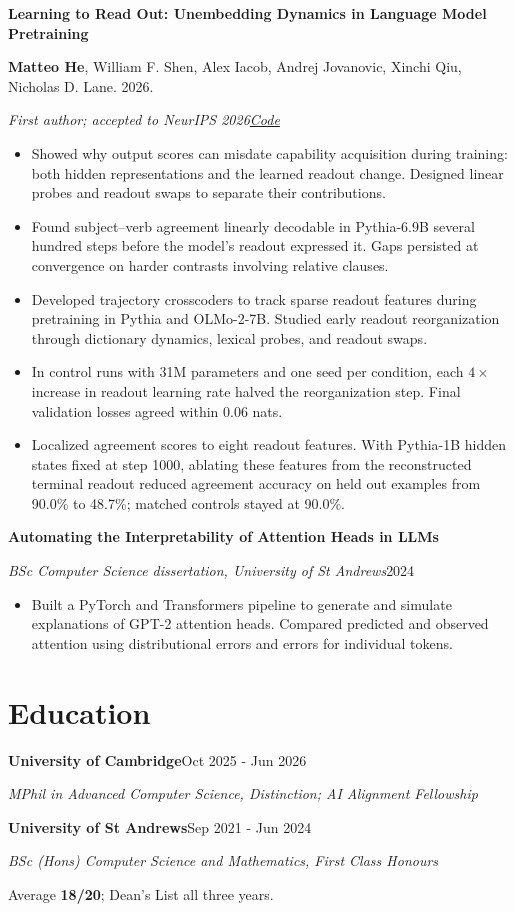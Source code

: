 \documentclass[letterpaper,11pt]{article}
\newcommand{\paper}[3]{\par\addvspace{7pt}\textbf{#1}\par{\fontsize{9.7}{11.3}\selectfont #2\par\textit{#3}\par}\nopagebreak}
\newcommand{\position}[4]{\par\addvspace{4pt}\textbf{#1}\hfill #2\par\textit{#3}\hfill\textit{#4}\par\nopagebreak}
\begin{document}
\paper{Learning to Read Out: Unembedding Dynamics in Language Model Pretraining}
{\textbf{Matteo He}, William F. Shen, Alex Iacob, Andrej Jovanovic, Xinchi Qiu, Nicholas D. Lane. 2026.}
{First author; accepted to NeurIPS 2026\enspace\textbar\enspace\href{https://github.com/hematteo/learning-to-read-out}{Code}}
\begin{itemize}
\item Showed why output scores can misdate capability acquisition during training: both hidden representations and the learned readout change. Designed linear probes and readout swaps to separate their contributions.
\item Found subject--verb agreement linearly decodable in Pythia-6.9B several hundred steps before the model's readout expressed it. Gaps persisted at convergence on harder contrasts involving relative clauses.
\item Developed trajectory crosscoders to track sparse readout features during pretraining in Pythia and OLMo-2-7B. Studied early readout reorganization through dictionary dynamics, lexical probes, and readout swaps.
\item In control runs with 31M parameters and one seed per condition, each \(4\times\) increase in readout learning rate halved the reorganization step. Final validation losses agreed within 0.06 nats.
\item Localized agreement scores to eight readout features. With Pythia-1B hidden states fixed at step 1000, ablating these features from the reconstructed terminal readout reduced agreement accuracy on held out examples from 90.0\% to 48.7\%; matched controls stayed at 90.0\%.
\end{itemize}

\par\addvspace{7pt}\textbf{Automating the Interpretability of Attention Heads in LLMs}\par
\textit{BSc Computer Science dissertation, University of St Andrews}\hfill 2024
\begin{itemize}
\item Built a PyTorch and Transformers pipeline to generate and simulate explanations of GPT-2 attention heads. Compared predicted and observed attention using distributional errors and errors for individual tokens.
\end{itemize}

\section{Education}
\position{University of Cambridge}{Oct 2025 - Jun 2026}{MPhil in Advanced Computer Science, Distinction; AI Alignment Fellowship}{ }
\position{University of St Andrews}{Sep 2021 - Jun 2024}{BSc (Hons) Computer Science and Mathematics, First Class Honours}{ }
Average \textbf{18/20}; Dean's List all three years.
\end{document}
